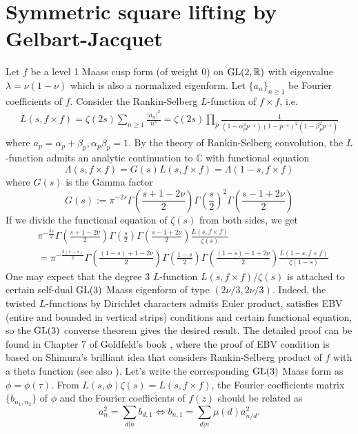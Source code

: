 \section{Symmetric square lifting by Gelbart-Jacquet}

Let $f$ be a level 1 Maass cusp form (of weight 0) on $\operatorname{\mathrm{GL}}(2,\mathbb{R})$ with eigenvalue $\lambda = \nu(1-\nu)$ which is also a normalized eigenform.
Let $\{a_{n}\}_{n\geq 1}$ be Fourier coefficients of $f$.
Consider the Rankin-Selberg $L$-function of $f \times f$, i.e.
\begin{align*}
L(s, f \times f) = \zeta(2s)\sum_{n\geq 1} \frac{|a_{n}|^{2}}{n^{s}}
= \zeta(2s)\prod_{p}  \frac{1}{(1-\alpha_{p}^{2}p^{-s})(1-p^{-s})^{2}(1-\beta_{p}^{2}p^{-s})}
\end{align*}
where $a_{p} = \alpha_{p} + \beta_{p}, \alpha_{p}\beta_{p} =1$.
By the theory of Rankin-Selberg convolution, the $L$-function admits an analytic continuation to $\mathbb{C}$ with functional equation
$$
\Lambda(s, f \times f) = G(s)L(s, f\times f) = \Lambda(1-s, f\times f)
$$
where $G(s)$ is the Gamma factor
$$
G(s) := \pi^{-2s}\Gamma\left(\frac{s + 1 - 2\nu}{2}\right)\Gamma\left(\frac{s}{2}\right)^{2} \Gamma\left(\frac{s - 1 + 2\nu}{2}\right)
$$
If we divide the functional equation of $\zeta(s)$ from both sides, we get
\begin{align*}
    &\pi^{-\frac{3s}{2}} \Gamma\left(\frac{s + 1 - 2\nu}{2}\right)\Gamma\left(\frac{s}{2}\right) \Gamma\left(\frac{s - 1 + 2\nu}{2}\right) \frac{L(s, f\times f)}{\zeta(s)} \\
    &=\pi^{-\frac{3(1-s)}{2}} \Gamma\left(\frac{(1-s) + 1 - 2\nu}{2}\right)\Gamma\left(\frac{1-s}{2}\right) \Gamma\left(\frac{(1-s) - 1 + 2\nu}{2}\right) \frac{L(1-s, f\times f)}{\zeta(1-s)}
\end{align*}
One may expect that the degree 3 $L$-function $L(s, f\times f) / \zeta(s)$ is attached to certain self-dual $\operatorname{\mathrm{GL}}(3)$ Maass eigenform of type $(2\nu/3, 2\nu/3)$.
Indeed, the twisted $L$-functions by Dirichlet characters admits Euler product, satisfies EBV (entire and bounded in vertical strips) conditions and certain functional equation, 
so the $\operatorname{\mathrm{GL}}(3)$ converse theorem gives the desired result.
The detailed proof can be found in Chapter 7 of Goldfeld's book \cite{goldfeld2006automorphic},
where the proof of EBV condition is based on Shimura's brilliant idea that considers Rankin-Selberg product of $f$ 
with a theta function (see also \cite{shimura1975holomorphy}).
Let's write the corresponding $\operatorname{\mathrm{GL}}(3)$ Maass form as $\phi = \phi(\tau)$.
From $L(s, \phi)\zeta(s) = L(s, f\times f)$, the Fourier coefficients matrix $\{b_{n_{1}, n_{2}}\}$ of $\phi$ and the Fourier coefficients of $f(z)$ should be related as
$$
a_{n}^{2} = \sum_{d|n} b_{d, 1} \Longleftrightarrow b_{n, 1} = \sum_{d|n} \mu(d) a_{n/d}^{2}.
$$


